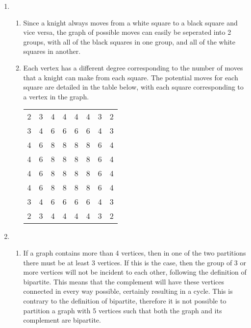\documentclass{article}
\begin{document}
\begin{enumerate}
		\item
		\begin{enumerate}
			\item Since a knight always moves from a white square to a black square and vice versa, the graph of possible moves can easily be seperated into 2 groups, with all of the black squares in one group, and all of the white squares in another.
			\item Each vertex has a different degree corresponding to the number of moves that a knight can make from each square. The potential moves for each square are detailed in the table below, with each square corresponding to a vertex in the graph.
			\newline 
			\begin{center}
				\begin{tabular}{llllllll}
					\multicolumn{1}{c}{2} & 3 & 4 & 4 & 4 & 4 & 3 & 2 \\
					3                     & 4 & 6 & 6 & 6 & 6 & 4 & 3 \\
					4                     & 6 & 8 & 8 & 8 & 8 & 6 & 4 \\
					4                     & 6 & 8 & 8 & 8 & 8 & 6 & 4 \\
					4                     & 6 & 8 & 8 & 8 & 8 & 6 & 4 \\
					4                     & 6 & 8 & 8 & 8 & 8 & 6 & 4 \\
					3                     & 4 & 6 & 6 & 6 & 6 & 4 & 3 \\
					2                     & 3 & 4 & 4 & 4 & 4 & 3 & 2
				\end{tabular}
			\end{center}
		\end{enumerate}
		
		\item
		\begin{enumerate}
			\item If a graph contains more than 4 vertices, then in one of the two partitions there must be at least 3 vertices. If this is the case, then the group of 3 or more vertices will not be incident to each other, following the definition of bipartite. This means that the complement will have these vertices connected in every way possible, certainly resulting in a cycle. This is contrary to the definition of bipartite, therefore it is not possible to partition a graph with 5 vertices such that both the graph and its complement are bipartite.
			

\end{enumerate}
\end{enumerate}
\end{document}
